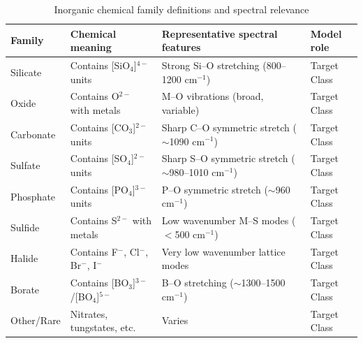 \begin{table}[htbp]
\caption{Inorganic chemical family definitions and spectral relevance}
\label{tab:family_defs}
\centering

\begin{tabular}{llll}
\toprule
\textbf{Family} & \textbf{Chemical meaning} & \textbf{Representative spectral features} & \textbf{Model role} \\
\midrule
Silicate & Contains [SiO$_4$]$^{4-}$ units & Strong Si--O stretching (800--1200 cm$^{-1}$) & Target Class \\
Oxide & Contains O$^{2-}$ with metals & M--O vibrations (broad, variable) & Target Class \\
Carbonate & Contains [CO$_3$]$^{2-}$ units & Sharp C--O symmetric stretch ($\sim$1090 cm$^{-1}$) & Target Class \\
Sulfate & Contains [SO$_4$]$^{2-}$ units & Sharp S--O symmetric stretch ($\sim$980--1010 cm$^{-1}$) & Target Class \\
Phosphate & Contains [PO$_4$]$^{3-}$ units & P--O symmetric stretch ($\sim$960 cm$^{-1}$) & Target Class \\
Sulfide & Contains S$^{2-}$ with metals & Low wavenumber M--S modes ($<$500 cm$^{-1}$) & Target Class \\
Halide & Contains F$^-$, Cl$^-$, Br$^-$, I$^-$ & Very low wavenumber lattice modes & Target Class \\
Borate & Contains [BO$_3$]$^{3-}$/[BO$_4$]$^{5-}$ & B--O stretching ($\sim$1300--1500 cm$^{-1}$) & Target Class \\
Other/Rare & Nitrates, tungstates, etc. & Varies & Target Class \\
\bottomrule
\end{tabular}

\end{table}
